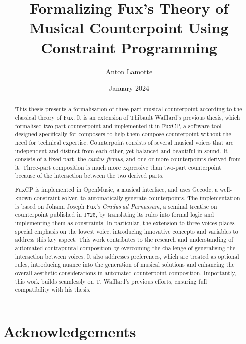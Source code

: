 \documentclass[11pt,table,xcdraw]{report}
\title{Formalizing Fux's Theory of Musical Counterpoint Using Constraint Programming}
\author{Anton Lamotte}
\date{January 2024}
\newcommand{\gap}{\textit{Gradus ad Parnassum}}
\newcommand{\cf}{\textit{cantus firmus}}
\begin{document}

\null
\thispagestyle{empty}
\addtocounter{page}{-1}
\newpage
{}
\begin{abstract}
    \large{
        This thesis presents a formalisation of three-part musical counterpoint according to the classical theory of Fux. It is an extension of Thibault Wafflard's previous thesis, which formalised two-part counterpoint and implemented it in FuxCP, a software tool designed specifically for composers to help them compose counterpoint without the need for technical expertise. Counterpoint consists of several musical voices that are independent and distinct from each other, yet balanced and beautiful in sound. It consists of a fixed part, the \cf, and one or more counterpoints derived from it. Three-part composition is much more expressive than two-part counterpoint because of the interaction between the two derived parts.

        FuxCP is implemented in OpenMusic, a musical interface, and uses Gecode, a well-known constraint solver, to automatically generate counterpoints. The implementation is based on Johann Joseph Fux's \gap, a seminal treatise on counterpoint published in 1725, by translating its rules into formal logic and implementing them as constraints. In particular, the extension to three voices places special emphasis on the lowest voice, introducing innovative concepts and variables to address this key aspect.
        This work contributes to the research and understanding of automated contrapuntal composition by overcoming the challenge of generalising the interaction between voices. It also addresses preferences, which are treated as optional rules, introducing nuance into the generation of musical solutions and enhancing the overall aesthetic considerations in automated counterpoint composition. Importantly, this work builds seamlessly on T. Wafflard's previous efforts, ensuring full compatibility with his thesis.   }
\end{abstract}

\chapter*{Acknowledgements}
\end{document}
